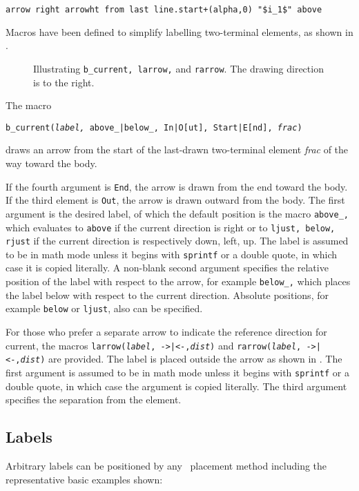   \verb|arrow right arrowht from last line.start+(alpha,0) "$i_1$" above|

\enlargethispage{\baselineskip}%
Macros have been defined to simplify labelling two-terminal
elements, as shown in .
\begin{figure}[ht]
   
   \caption{Illustrating {\tt b\_current, larrow,} and {\tt rarrow}.
      The drawing direction is to the right.}
   \label{currents}
   \end{figure}
The macro

   {\tt b\_current({\sl label,} above\_|below\_, In|O[ut], Start|E[nd],
   {\sl frac})}

\noindent
draws an arrow from the start of the last-drawn two-terminal element
{\sl frac} of the way toward the body.

If the fourth argument is {\tt End}, the arrow is drawn from the end
toward the body.
If the third element is {\tt Out}, the arrow is drawn outward from the body.
The first argument is the desired label, of which the default position is
the macro {\tt above\_,} which evaluates to {\tt above} if the current
direction is right or to {\tt ljust, below, rjust} if the current
direction is respectively down, left, up.  The label is assumed to be
in math mode unless it begins with {\tt sprintf} or a double quote, in which
case it is copied literally.  A non-blank second argument specifies the
relative position of the label with respect to the arrow, for example
{\tt below\_,} which places the label below with respect to the current
direction.  Absolute positions, for example {\tt below} or {\tt ljust},
also can be specified.

For those who prefer a separate arrow to indicate the reference
direction for current, the macros {\tt larrow({\sl label}, ->|<-,{\sl dist})}
and {\tt rarrow({\sl label}, ->|<-,{\sl dist})} are provided.  The label is
placed outside the arrow as shown in .  The first
argument is assumed to be in math mode unless
it begins with {\tt sprintf} or a double
quote, in which case the argument is copied literally.  The third argument
specifies the separation from the element.

\subsection{Labels\label{Labels:}}
   Arbitrary labels
   can be positioned by any \pic\ placement method including the
   representative basic examples shown:

